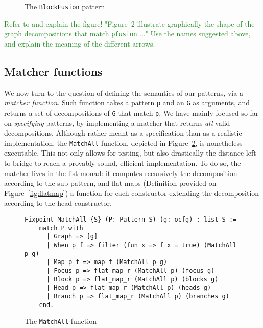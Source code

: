 \documentclass[11pt]{article}
\newcommand{\inlinecoq}[1]{\mbox{\lstinline[style=customcoq,columns=fixed,basewidth=.48em]{#1}}}
\newcommand{\ilc}[1]{\inlinecoq{#1}}
\newcommand{\yz}[1]{\textcolor{ForestGreen}{#1}}
\newcommand{\yzt}[1]{\textcolor{ForestGreen!50}{#1}}
\begin{document}
\begin{figure}[h]
  \caption{The \ilc{BlockFusion} pattern}
  \label{fig:fusion}
\end{figure}

\yz{Refer to and explain the figure! "Figure~2 illustrate graphically the shape of the graph decompositions that match \ilc{pfusion} ..." Use the names suggested above, and explain the meaning of the different arrows.}

\subsection{Matcher functions}
\label{sec:matcher}

We now turn to the question of defining the semantics of our patterns, via a \emph{matcher function}. 
\yzt{Such function takes a pattern \ilc{p} and an \ocfg{} \ilc{G} as arguments, and returns a set of decompositions of \ilc{G} that match \ilc{p}.}
\yzt{We have mainly focused so far on \emph{specifying} patterns, by implementing a matcher that returns \emph{all} valid decompositions. 
Although rather meant as a specification than as a realistic implementation, the \ilc{MatchAll} function, depicted in Figure~\ref{fig:matchall}, is nonetheless executable. This not only allows for testing, but also drastically the distance left to bridge to reach a provably sound, efficient implementation. To do so, the matcher lives in the list monad: it computes recursively the decomposition according to the sub-pattern, and flat maps (Definition provided on Figure~\ref{fig:flatmap}) a function for each constructor extending the decomposition according to the head constructor.}

\begin{figure}[H]
  \label{fig:match}
  \begin{lstlisting}[style=customcoq,basicstyle=\small\ttfamily]
    Fixpoint MatchAll {S} (P: Pattern S) (g: ocfg) : list S :=
    match P with
      | Graph => [g]
      | When p f => filter (fun x => f x = true) (MatchAll p g) 
      | Map p f => map f (MatchAll p g)
      | Focus p => flat_map_r (MatchAll p) (focus g)
      | Block p => flat_map_r (MatchAll p) (blocks g)
      | Head p => flat_map_r (MatchAll p) (heads g)
      | Branch p => flat_map_r (MatchAll p) (branches g)
    end.
  \end{lstlisting}
  \caption{The \ilc{MatchAll} function}
  \label{fig:matchall}
\end{figure}
\end{document}
